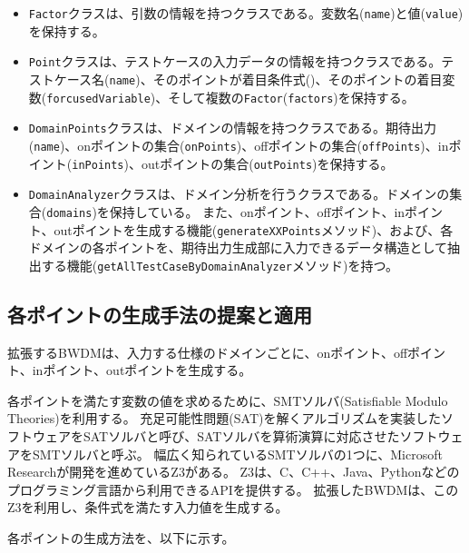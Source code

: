 \documentclass[uplatex, report, a4j, 10pt]{jsbook}
\newcommand\ttt[1]{\texttt{#1}}
\begin{document}
\begin{itemize}
  \item \ttt{Factor}クラスは、引数の情報を持つクラスである。変数名(\ttt{name})と値(\ttt{value})を保持する。
  \item \ttt{Point}クラスは、テストケースの入力データの情報を持つクラスである。テストケース名(\ttt{name})、そのポイントが着目条件式(\forcusedConditionalExpression{})、そのポイントの着目変数(\ttt{forcusedVariable})、そして複数の\ttt{Factor}(\ttt{factors})を保持する。
  \item \ttt{DomainPoints}クラスは、ドメインの情報を持つクラスである。期待出力(\ttt{name})、onポイントの集合(\ttt{onPoints})、offポイントの集合(\ttt{offPoints})、inポイント(\ttt{inPoints})、outポイントの集合(\ttt{outPoints})を保持する。
  \item \ttt{DomainAnalyzer}クラスは、ドメイン分析を行うクラスである。ドメインの集合(\ttt{domains})を保持している。
        また、onポイント、offポイント、inポイント、outポイントを生成する機能(\ttt{generateXXPoints}メソッド)、および、各ドメインの各ポイントを、期待出力生成部に入力できるデータ構造として抽出する機能(\ttt{getAllTestCaseByDomainAnalyzer}メソッド)を持つ。

\end{itemize}

\subsection{各ポイントの生成手法の提案と適用}\label{cha:create_point}
拡張するBWDMは、入力する仕様のドメインごとに、onポイント、offポイント、inポイント、outポイントを生成する。

各ポイントを満たす変数の値を求めるために、SMTソルバ(Satisfiable Modulo Theories)\cite{sat}を利用する。
充足可能性問題(SAT)を解くアルゴリズムを実装したソフトウェアをSATソルバと呼び、SATソルバを算術演算に対応させたソフトウェアをSMTソルバと呼ぶ。
幅広く知られているSMTソルバの1つに、Microsoft Researchが開発を進めているZ3\cite{z3}がある。
Z3は、C、C++、Java、Pythonなどのプログラミング言語から利用できるAPIを提供する。
拡張したBWDMは、このZ3を利用し、条件式を満たす入力値を生成する。

各ポイントの生成方法を、以下に示す。
\end{document}
